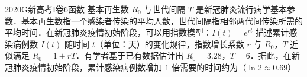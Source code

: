 
\begin{problem}{2020}{G}{新高考I卷}{6}{函数}
基本再生数 $ R_0 $ 与世代间隔 $ T $ 是新冠肺炎流行病学基本参数．基本再生数指一个感染者传染的平均人数，世代间隔指相邻两代间传染所需的平均时间．在新冠肺炎疫情初始阶段，可以用指数模型：$ I(t)=e^{rt} $ 描述累计感染病例数 $ I(t) $ 随时间 $ t $（单位：天）的变化规律，指数增长系数 $ r $ 与 $ R_0 $，$ T $ 近似满足 $ R_0=1+rT $．有学者基于已有数据估计出 $ R_0=3.28 $，$ T=6 $．据此，在新冠肺炎疫情初始阶段，累计感染病例数增加 $ 1 $ 倍需要的时间约为（$ \ln 2\approx 0.69 $）
\begin{choices}
\end{choices}
\end{problem}

\begin{answer}

\end{answer}

\begin{solutions}

\end{solutions}